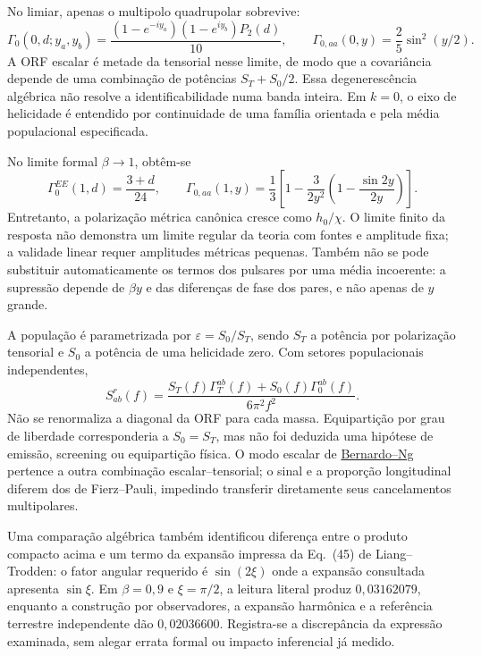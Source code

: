 No limiar, apenas o multipolo quadrupolar sobrevive:
\begin{equation}
 \Gamma_0(0,d;y_a,y_b)=\frac{(1-e^{-iy_a})(1-e^{iy_b})P_2(d)}{10},
 \qquad \Gamma_{0,aa}(0,y)=\frac25\sin^2(y/2).
\end{equation}
A ORF escalar é metade da tensorial nesse limite, de modo que a covariância depende de uma combinação de potências $S_T+S_0/2$. Essa degenerescência algébrica não resolve a identificabilidade numa banda inteira. Em $k=0$, o eixo de helicidade é entendido por continuidade de uma família orientada e pela média populacional especificada.

No limite formal $\beta\to1$, obtêm-se
\begin{equation}
 \Gamma_0^{EE}(1,d)=\frac{3+d}{24},\qquad
 \Gamma_{0,aa}(1,y)=\frac13\left[1-\frac{3}{2y^2}
 \left(1-\frac{\sin 2y}{2y}\right)\right].
\end{equation}
Entretanto, a polarização métrica canônica cresce como $h_0/\chi$. O limite finito da resposta não demonstra um limite regular da teoria com fontes e amplitude fixa; a validade linear requer amplitudes métricas pequenas. Também não se pode substituir automaticamente os termos dos pulsares por uma média incoerente: a supressão depende de $\beta y$ e das diferenças de fase dos pares, e não apenas de $y$ grande.

A população é parametrizada por $\varepsilon=S_0/S_T$, sendo $S_T$ a potência por polarização tensorial e $S_0$ a potência de uma helicidade zero. Com setores populacionais independentes,
\begin{equation}
 S^r_{ab}(f)=\frac{S_T(f)\Gamma_T^{ab}(f)+S_0(f)\Gamma_0^{ab}(f)}{6\pi^2f^2}.
\end{equation}
Não se renormaliza a diagonal da ORF para cada massa. Equipartição por grau de liberdade corresponderia a $S_0=S_T$, mas não foi deduzida uma hipótese de emissão, screening ou equipartição física. O modo escalar de \href{https://arxiv.org/pdf/2306.13593v4}{Bernardo--Ng} pertence a outra combinação escalar--tensorial; o sinal e a proporção longitudinal diferem dos de Fierz--Pauli, impedindo transferir diretamente seus cancelamentos multipolares.

Uma comparação algébrica também identificou diferença entre o produto compacto acima e um termo da expansão impressa da Eq.~(45) de Liang--Trodden: o fator angular requerido é $\sin(2\xi)$ onde a expansão consultada apresenta $\sin\xi$. Em $\beta=0{,}9$ e $\xi=\pi/2$, a leitura literal produz $0{,}03162079$, enquanto a construção por observadores, a expansão harmônica e a referência terrestre independente dão $0{,}02036600$. Registra-se a discrepância da expressão examinada, sem alegar errata formal ou impacto inferencial já medido.

